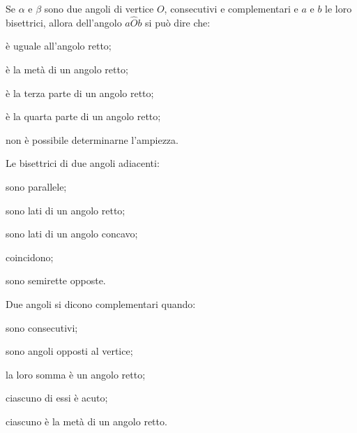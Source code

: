 \begin{esercizio}
Se \(\alpha\) e \(\beta\) sono due angoli di vertice \(O\), consecutivi e 
complementari e \(a\) e \(b\) le loro bisettrici, allora dell'angolo 
\(a\widehat{O}b\) si può dire  che:
\begin{multicols}{2}
\begin{enumeratea}
\item è uguale all'angolo retto;
\item è la metà di un angolo retto;
\item è la terza parte di un angolo retto;
\item è la quarta parte di un angolo retto;
\item non è possibile determinarne l'ampiezza.
\end{enumeratea}
\end{multicols}
\end{esercizio}

\begin{esercizio}
Le bisettrici di due angoli adiacenti:
\begin{multicols}{2}
\begin{enumeratea}
\item sono parallele;
\item sono lati di un angolo retto;
\item sono lati di un angolo concavo;
\item coincidono;
\item sono semirette opposte.
\end{enumeratea}
\end{multicols}
\end{esercizio}

\begin{esercizio}
Due angoli si dicono complementari quando:
\begin{multicols}{2}
\begin{enumeratea}
\item sono consecutivi;
\item sono angoli opposti al vertice;
\item la loro somma è un angolo retto;
\item ciascuno di essi è acuto;
\item ciascuno è la metà di un angolo retto.
\end{enumeratea}
\end{multicols}
\end{esercizio}

